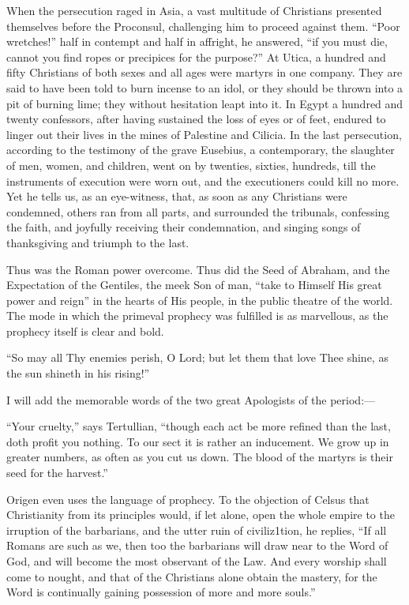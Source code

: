 When the persecution raged in Asia, a vast multitude of Christians
presented themselves before the Proconsul, challenging him to proceed
against them. ``Poor wretches!'' half in contempt and half in
affright, he answered, ``if you must die, cannot you find ropes or
precipices for the purpose?'' At Utica, a hundred and fifty
Christians of both sexes and all ages were martyrs in one company.
They are said to have been told to burn incense to an idol, or they
should be thrown into a pit of burning lime; they without
hesitation leapt into it. In Egypt a hundred and twenty confessors,
after having sustained the loss of eyes or of feet, endured to linger
out their lives in the mines of Palestine and Cilicia. In the last
persecution, according to the testimony of the grave Eusebius, a
contemporary, the slaughter of men, women, and children, went on by
twenties, sixties, hundreds, till the instruments of execution were
worn out, and the executioners could kill no more. Yet he tells us, as
an eye-witness, that, as soon as any Christians were condemned, others
ran from all parts, and surrounded the tribunals, confessing the
faith, and joyfully receiving their condemnation, and singing songs of
thanksgiving and triumph to the last.

Thus was the Roman power overcome. Thus did the Seed of Abraham,
and the Expectation of the Gentiles, the meek Son of man, ``take
to Himself His great power and reign'' in the hearts of His
people, in the public theatre of the world. The mode in which the
primeval prophecy was fulfilled is as marvellous, as the prophecy
itself is clear and bold.

``So may all Thy enemies perish, O Lord; but let them that love
Thee shine, as the sun shineth in his rising!''

I will add the memorable words of the two great Apologists of the
period:—

``Your cruelty,'' says Tertullian, ``though each
act be more refined than the last, doth profit you nothing. To
our sect it is rather an inducement. We grow up in greater numbers, as
often as you cut us down. The blood of the martyrs is their seed for
the harvest.''

Origen even uses the language of prophecy. To the objection of
Celsus that Christianity from its principles would, if let alone, open
the whole empire to the irruption of the barbarians, and the utter
ruin of civiliz1tion, he replies, ``If all Romans are such as we,
then too the barbarians will draw near to the Word of God, and will
become the most observant of the Law. And every worship shall come to
nought, and that of the Christians alone obtain the mastery, for the
Word is continually gaining possession of more and more souls.''

